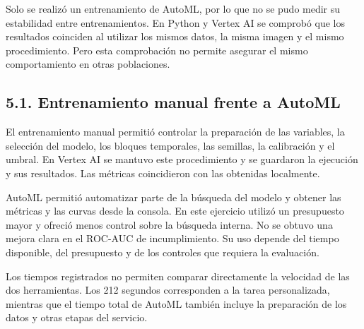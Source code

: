 Solo se realizó un entrenamiento de AutoML, por lo que no se pudo medir su estabilidad entre entrenamientos. En Python y Vertex AI se comprobó que los resultados coinciden al utilizar los mismos datos, la misma imagen y el mismo procedimiento. Pero esta comprobación no permite asegurar el mismo comportamiento en otras poblaciones.


\FloatBarrier


\subsection{5.1. Entrenamiento manual frente a AutoML}

El entrenamiento manual permitió controlar la preparación de las variables, la selección del modelo, los bloques temporales, las semillas, la calibración y el umbral. En Vertex AI se mantuvo este procedimiento y se guardaron la ejecución y sus resultados. Las métricas coincidieron con las obtenidas localmente.


AutoML permitió automatizar parte de la búsqueda del modelo y obtener las métricas y las curvas desde la consola. En este ejercicio utilizó un presupuesto mayor y ofreció menos control sobre la búsqueda interna. No se obtuvo una mejora clara en el ROC-AUC de incumplimiento. Su uso depende del tiempo disponible, del presupuesto y de los controles que requiera la evaluación.


Los tiempos registrados no permiten comparar directamente la velocidad de las dos herramientas. Los 212 segundos corresponden a la tarea personalizada, mientras que el tiempo total de AutoML también incluye la preparación de los datos y otras etapas del servicio.


